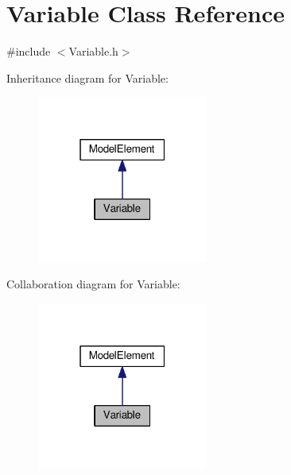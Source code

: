 \hypertarget{class_variable}{}\section{Variable Class Reference}
\label{class_variable}


{\ttfamily \#include $<$Variable.\+h$>$}



Inheritance diagram for Variable\+:\nopagebreak
\begin{figure}[H]
\begin{center}
\leavevmode
\includegraphics[width=159pt]{class_variable__inherit__graph}
\end{center}
\end{figure}


Collaboration diagram for Variable\+:\nopagebreak
\begin{figure}[H]
\begin{center}
\leavevmode
\includegraphics[width=159pt]{class_variable__coll__graph}
\end{center}
\end{figure}

